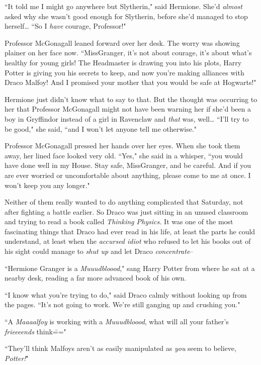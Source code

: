 ``It told me I might go anywhere but Slytherin," said Hermione. She'd \emph{almost} asked why she wasn't good enough for Slytherin, before she'd managed to stop herself{\ldots} ``So I \emph{have} courage, Professor!"

Professor McGonagall leaned forward over her desk. The worry was showing plainer on her face now. ``Miss\?Granger, it's not about courage, it's about what's healthy for young girls! The Headmaster is drawing you into his plots, Harry Potter is giving you his secrets to keep, and now you're making alliances with Draco Malfoy! And I promised your mother that you would be safe at Hogwarts!"

Hermione just didn't know what to say to that. But the thought was occurring to her that Professor McGonagall might not have been warning her if she'd been a boy in Gryffindor instead of a girl in Ravenclaw and \emph{that} was, well{\ldots} ``I'll try to be good," she said, ``and I won't let anyone tell me otherwise."

Professor McGonagall pressed her hands over her eyes. When she took them away, her lined face looked very old. ``Yes," she said in a whisper, ``you would have done well in my House. Stay safe, Miss\?Granger, and be careful. And if you are ever worried or uncomfortable about anything, please come to me at once. I won't keep you any longer."


Neither of them really wanted to do anything complicated that Saturday, not after fighting a battle earlier. So Draco was just sitting in an unused classroom and trying to read a book called \emph{Thinking Physics.} It was one of the most fascinating things that Draco had ever read in his life, at least the parts he could understand, at least when the \emph{accursed idiot} who refused to let his books out of his sight could manage to \emph{shut up} and let Draco \emph{concentrate}\---

``Hermione Granger is a \emph{Muuudbloood}," sang Harry Potter from where he sat at a nearby desk, reading a far more advanced book of his own.

``I know what you're trying to do," said Draco calmly without looking up from the pages. ``It's not going to work. We're still ganging up and crushing you."

``A \emph{Maaaalfoy} is working with a \emph{Muuudbloood}, what will all your father's \emph{frieeeends} think\==="

``They'll think Malfoys aren't as easily manipulated as \emph{you} seem to believe, \emph{Potter!}"

